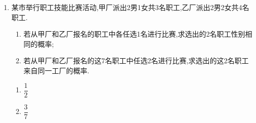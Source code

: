 \begin{enumerate}
\item 某市举行职工技能比赛活动,甲厂派出2男1女共3名职工,乙厂派出2男2女共4名职工.
\begin{enumerate}
\item 若从甲厂和乙厂报名的职工中各任选1名进行比赛,求选出的2名职工性别相同的概率;
\item 若从甲厂和乙厂报名的这7名职工中任选2名进行比赛,求选出的这2名职工来自同一工厂的概率.
\end{enumerate}
\begin{jieda}
    \begin{enumerate}
        \item $\dfrac{1}{2}$
        \item $\dfrac{3}{7}$
    \end{enumerate}
\end{jieda}


\end{enumerate}

